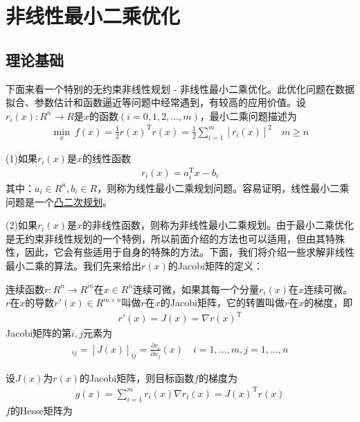 \chapter{非线性最小二乘优化}
\section{理论基础}
    \par
    下面来看一个特别的无约束非线性规划 - 非线性最小二乘优化。此优化问题在数据拟合、参数估计和函数逼近等问题中经常遇到，有较高的应用价值。设$r_i(x):R^n \rightarrow R$是$x$的函数$(i=0,1,2,\ldots,m)$，最小二乘问题描述为
    \begin{align*}
     \mathop {\min}\limits_x \ f(x)=\frac 12 r(x)^{\mathrm{T}}r(x)=\frac 12 \mathop {\sum}\limits_{i=1}^m [r_i(x)]^2 \quad m \geqslant n
    \end{align*}
    \par
    (1)如果$r_i(x)$是$x$的线性函数
    \begin{align*}
     r_i(x)=a_i^\mathrm{T} x-b_i
    \end{align*}
    其中：$a_i \in R^n,b_i \in R$，则称为线性最小二乘规划问题。容易证明，线性最小二乘问题是一个\underline{凸二次规划}。
    \par
    (2)如果$r_i(x)$是$x$的非线性函数，则称为非线性最小二乘规划。由于最小二乘优化是无约束非线性规划的一个特例，所以前面介绍的方法也可以适用，但由其特殊性，因此，它会有些适用于自身的特殊的方法。下面，我们将介绍一些求解非线性最小二乘的算法。我们先来给出$r(x)$的Jacobi矩阵的定义：
    \begin{definition}[Jacobi矩阵]
    连续函数$r:R^n \rightarrow R^m$在$x \in R^n$连续可微，如果其每一个分量$r_i(x)$在$x$连续可微。$r$在$x$的导数$r'(x)\in R^{m\times n}$叫做$r$在$x$的Jacobi矩阵，它的转置叫做$r$在$x$的梯度，即
    \begin{align*}
    r'(x)=J(x)=\nabla r(x)^\mathrm{T}
    \end{align*}
    Jacobi矩阵的第$i,j$元素为
    \begin{align*}
    [r'(x)]_{ij} = [J(x)]_{ij} = \frac{\partial r_i}{\partial x_j}(x) \quad i=1,\dots,m,j = 1,\dots,n
    \end{align*}
    \end{definition}
    \par
    设$J(x)$为$r(x)$的Jacobi矩阵，则目标函数$f$的梯度为
    \begin{align*}
     g(x)=\mathop {\sum}\limits_{i=1}^m r_i(x)\nabla r_i(x)=J(x)^\mathrm{T} r(x)
    \end{align*}
    $f$的Hesse矩阵为
